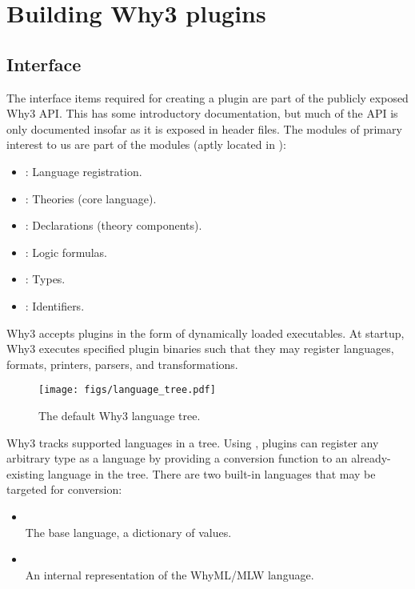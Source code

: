 \section{Building Why3 plugins} %

\subsection{Interface} %

The interface items required for creating a plugin
are part of the publicly exposed Why3 API.
This has some introductory documentation, %
but much of the API is only documented insofar as it is exposed in header files.
The modules of primary interest to us are part of the  modules
(aptly located in ):
\begin{itemize}
    \item {}: Language registration.
    \item {}: Theories (core language).
    \item {}: Declarations (theory components).
    \item {}: Logic formulas.
    \item {}: Types.
    \item {}: Identifiers.
\end{itemize}

Why3 accepts plugins in the form of dynamically loaded executables.
At startup, Why3 executes specified plugin binaries
such that they may register languages, formats, printers, parsers, and transformations.

\begin{figure}[H]
    \center
    \texttt{[image: figs/language\_tree.pdf]}
    \caption{The default Why3 language tree. \label{fig:langtree}}
\end{figure}

Why3 tracks supported languages in a tree.
Using ,
plugins can register any arbitrary type as a language
by providing a conversion function to an already-existing language in the tree.
There are two built-in languages that may be targeted for conversion:

\begin{itemize}
    \item {}\\
          The base language, a dictionary of  values.
    \item {}\\
          An internal representation of the WhyML/MLW language.
\end{itemize}

